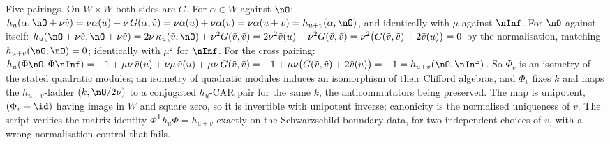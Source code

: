 Five pairings. On $W \times W$ both sides are $G$. For $\alpha \in W$ against $\nO$: $h_u(\alpha, \nO + \nu\tilde v) = \nu\alpha(u) + \nu\,G(\alpha, \tilde v) = \nu\alpha(u) + \nu\alpha(v) = \nu\alpha(u + v) = h_{u+v}(\alpha, \nO)$, and identically with $\mu$ against $\nInf$. For $\nO$ against itself: $h_u(\nO + \nu\tilde v, \nO + \nu\tilde v) = 2\nu\,\kappa_u(\tilde v, \nO) + \nu^2 G(\tilde v, \tilde v) = 2\nu^2\tilde v(u) + \nu^2 G(\tilde v, \tilde v) = \nu^2\bigl(G(\tilde v,\tilde v) + 2\tilde v(u)\bigr) = 0$ by the normalisation, matching $h_{u+v}(\nO, \nO) = 0$; identically with $\mu^2$ for $\nInf$. For the cross pairing: $h_u(\Phi\nO, \Phi\nInf) = -1 + \mu\nu\,\tilde v(u) + \nu\mu\,\tilde v(u) + \mu\nu\,G(\tilde v, \tilde v) = -1 + \mu\nu\bigl(G(\tilde v, \tilde v) + 2\tilde v(u)\bigr) = -1 = h_{u+v}(\nO, \nInf)$. So $\Phi_v$ is an isometry of the stated quadratic modules; an isometry of quadratic modules induces an isomorphism of their Clifford algebras, and $\Phi_v$ fixes $k$ and maps the $h_{u+v}$-ladder $(k, \nO/2\nu)$ to a conjugated $h_u$-CAR pair for the same $k$, the anticommutators being preserved. The map is unipotent, $(\Phi_v - \id)$ having image in $W$ and square zero, so it is invertible with unipotent inverse; canonicity is the normalised uniqueness of $\tilde v$. The script verifies the matrix identity $\Phi^{\mathsf{T}} h_u \Phi = h_{u+v}$ exactly on the Schwarzschild boundary data, for two independent choices of $v$, with a wrong-normalisation control that fails.
